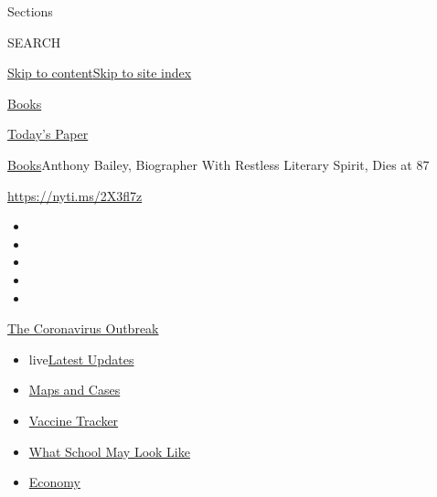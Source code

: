Sections

SEARCH

\protect\hyperlink{site-content}{Skip to
content}\protect\hyperlink{site-index}{Skip to site index}

\href{https://www.nytimes.com/section/books}{Books}

\href{https://myaccount.nytimes.com/auth/login?response_type=cookie\&client_id=vi}{}

\href{https://www.nytimes.com/section/todayspaper}{Today's Paper}

\href{/section/books}{Books}\textbar{}Anthony Bailey, Biographer With
Restless Literary Spirit, Dies at 87

\url{https://nyti.ms/2X3fl7z}

\begin{itemize}
\item
\item
\item
\item
\item
\end{itemize}

\href{https://www.nytimes.com/news-event/coronavirus?action=click\&pgtype=Article\&state=default\&region=TOP_BANNER\&context=storylines_menu}{The
Coronavirus Outbreak}

\begin{itemize}
\tightlist
\item
  live\href{https://www.nytimes.com/2020/08/01/world/coronavirus-covid-19.html?action=click\&pgtype=Article\&state=default\&region=TOP_BANNER\&context=storylines_menu}{Latest
  Updates}
\item
  \href{https://www.nytimes.com/interactive/2020/us/coronavirus-us-cases.html?action=click\&pgtype=Article\&state=default\&region=TOP_BANNER\&context=storylines_menu}{Maps
  and Cases}
\item
  \href{https://www.nytimes.com/interactive/2020/science/coronavirus-vaccine-tracker.html?action=click\&pgtype=Article\&state=default\&region=TOP_BANNER\&context=storylines_menu}{Vaccine
  Tracker}
\item
  \href{https://www.nytimes.com/interactive/2020/07/29/us/schools-reopening-coronavirus.html?action=click\&pgtype=Article\&state=default\&region=TOP_BANNER\&context=storylines_menu}{What
  School May Look Like}
\item
  \href{https://www.nytimes.com/live/2020/07/31/business/stock-market-today-coronavirus?action=click\&pgtype=Article\&state=default\&region=TOP_BANNER\&context=storylines_menu}{Economy}
\end{itemize}

